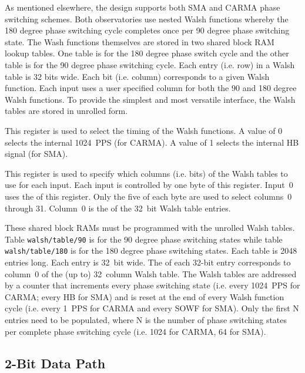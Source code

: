 \documentclass[12pt]{article}
\begin{document}
As mentioned elsewhere, the design supports both SMA and CARMA phase switching
schemes.  Both observatories use nested Walsh functions whereby the 180 degree
phase switching cycle completes once per 90 degree phase switching state.  The
Wash functions themselves are stored in two shared block RAM lookup tables.
One table is for the 180 degree phase switch cycle and the other table is for
the 90 degree phase switching cycle.  Each entry (i.e. row) in a Walsh table is
32 bits wide.  Each bit (i.e. column) corresponds to a given Walsh function.
Each input uses a user specified column for both the 90 and 180 degree Walsh
functions.  To provide the simplest and most versatile interface, the Walsh
tables are stored in unrolled form.

\begin{description}

 This register is used to select the timing of the Walsh functions.  A value of 0 selects the internal 1024~PPS (for CARMA).  A value of 1 selects the internal HB signal (for SMA).

 This register is used to specify which columns (i.e. bits)
of the Walsh tables to use for each input.  Each input is controlled by one
byte of this register.  Input~0 uses the \LSB of this register.  Only the five
\LSbs of each byte are used to select columns~0 through 31.  Column~0 is the
\MSb of the 32~bit Walsh table entries.

  These shared block RAMs must be
programmed with the unrolled Walsh tables.  Table \verb|walsh/table/90| is for
the 90 degree phase switching states while table \verb|walsh/table/180| is for
the 180 degree phase switching states.  Each table is 2048 entries long.  Each
entry is 32~bit wide.  The \MSb of each 32-bit entry corresponds to column~0 of
the (up to) 32~column Walsh table.  The Walsh tables are addressed by a counter
that increments every phase switching state (i.e. every 1024~PPS for CARMA;
every HB for SMA) and is reset at the end of every Walsh function cycle (i.e.
every 1~PPS for CARMA and every SOWF for SMA).  Only the first N entries need
to be populated, where N is the number of phase switching states per complete
phase switching cycle (i.e. 1024 for CARMA, 64 for SMA).

\end{description}

  \subsection{2-Bit Data Path}
\end{document}
